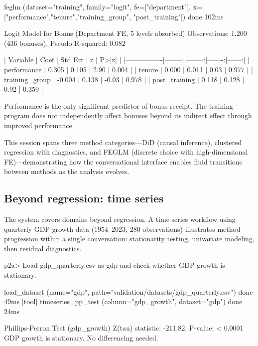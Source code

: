 \begin{Soutput}
  [tool] feglm (dataset="training", family="logit",
           fe=["department"],
           x=["performance","tenure","training_group",
               "post_training"])                                     done 102ms

Logit Model for Bonus (Department FE, 5 levels absorbed)
Observations: 1,200 (436 bonuses),  Pseudo R-squared: 0.082

| Variable       |    Coef | Std Err |      z | P>|z| |
|----------------|--------:|--------:|-------:|------:|
| performance    |   0.305 |   0.105 |  2.90  | 0.004 |
| tenure         |   0.000 |   0.011 |  0.03  | 0.977 |
| training_group |  -0.004 |   0.138 | -0.03  | 0.978 |
| post_training  |   0.118 |   0.128 |  0.92  | 0.359 |

Performance is the only significant predictor of bonus receipt.
The training program does not independently affect bonuses beyond
its indirect effect through improved performance.
\end{Soutput}

\noindent This session spans three method categories---DiD (causal
inference), clustered regression with diagnostics, and FEGLM (discrete
choice with high-dimensional FE)---demonstrating how the conversational
interface enables fluid transitions between methods as the analysis
evolves.

\subsection{Beyond regression: time series} \label{sec:examples-ts}

The system covers domains beyond regression. A time series workflow
using quarterly GDP growth data (1954--2023, 280 observations)
illustrates method progression within a single conversation:
stationarity testing, univariate modeling, then residual diagnostics.

\begin{Sinput}
p2a> Load gdp_quarterly.csv as gdp and check whether GDP growth
     is stationary.
\end{Sinput}

\begin{Soutput}
  [tool] load_dataset (name="gdp",
           path="validation/datasets/gdp_quarterly.csv")            done 49ms
  [tool] timeseries_pp_test (column="gdp_growth", dataset="gdp")    done 24ms

Phillips-Perron Test (gdp_growth)
Z(tau) statistic: -211.82,  P-value: < 0.0001
GDP growth is stationary. No differencing needed.
\end{Soutput}

